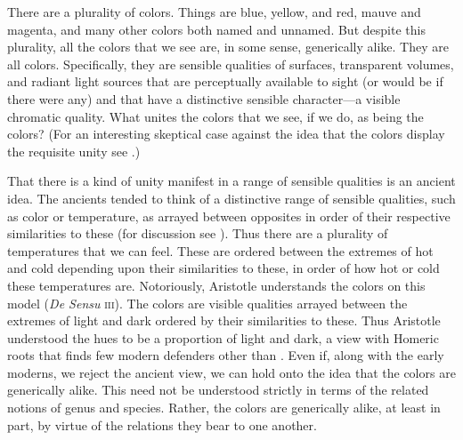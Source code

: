 \documentclass[12pt]{article}
\begin{document}

There are a plurality of colors. Things are blue, yellow, and red, mauve and magenta, and many other colors both named and unnamed. But despite this plurality, all the colors that we see are, in some sense, generically alike. They are all colors. Specifically, they are sensible qualities of surfaces, transparent volumes, and radiant light sources that are perceptually available to sight (or would be if there were any) and that have a distinctive sensible character---a visible chromatic quality. What unites the colors that we see, if we do, as being the colors? (For an interesting skeptical case against the idea that the colors display the requisite unity see \citealt{Matthen:1999ma}.)

That there is a kind of unity manifest in a range of sensible qualities is an ancient idea. The ancients tended to think of a distinctive range of sensible qualities, such as color or temperature, as arrayed between opposites in order of their respective similarities to these (for discussion see \citealt{Lloyd:1966ly}). Thus there are a plurality of temperatures that we can feel. These are ordered between the extremes of hot and cold depending upon their similarities to these, in order of how hot or cold these temperatures are. Notoriously, Aristotle understands the colors on this model (\emph{De Sensu} \textsc{iii}). The colors are visible qualities arrayed between the extremes of light and dark ordered by their similarities to these. Thus Aristotle understood the hues to be a proportion of light and dark, a view with Homeric roots \citep{Gladstone:1858fk} that finds few modern defenders other than \citet{Goethe:1810uq}. Even if, along with the early moderns, we reject the ancient view, we can hold onto the idea that the colors are generically alike. This need not be understood strictly in terms of the related notions of genus and species. Rather, the colors are generically alike, at least in part, by virtue of the relations they bear to one another. 

\end{document}
